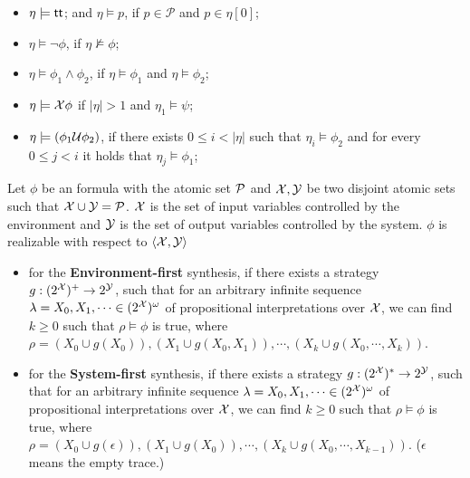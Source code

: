 \begin{itemize}%
  \item $\eta\models\true$; and $\eta\models p$, if $p\in\mathcal{P}$ and $p\in\eta[0]$;
  \item $\eta\models\neg\phi$, if $\eta\not\models\phi$;
  \item $\eta\models\phi_1\wedge\phi_2$,  if $\eta\models\phi_1$ and $\eta\models\phi_2$;
  \item $\eta\models \X\phi$ if $|\eta|>1$ and $\eta_1\models\psi$;
  \item $\eta\models (\phi_1 \U\phi_2)$, if there exists $0\leq i < |\eta|$
  such that $\eta_i\models\phi_2$ and for every $0\leq j < i$ it holds that $\eta_j\models\phi_1$;
  \end{itemize}


\begin{definition}\label{def:synthesis}
Let $\phi$ be an \ltlf formula with the atomic set $\P$ and $\X,\Y$ be two disjoint atomic sets such that $\X\cup \Y= \P$. $\X$ is the set of input variables controlled by the environment and $\Y$ is the set of output variables controlled by the system. $\phi$ is realizable with respect to $\langle \X,\Y\rangle$
\begin{itemize}
\item for the \textbf{Environment-first} synthesis, if there exists a strategy $g: (2^\X)^+ \to 2^\Y$, such that for an arbitrary infinite sequence $\lambda = X_0, X_1, \cdots \in (2^\X)^\omega$ of propositional interpretations over $\X$, we can find $k \geq 0$ such that $\rho\models\phi$ is true, where $\rho=(X_0\cup g(X_0)),(X_1\cup g(X_0,X_1)),\cdots,(X_k\cup g(X_0,\cdots,X_k))$.
\item for the \textbf{System-first} synthesis, if there exists a strategy $g: (2^\X)^* \to 2^\Y$, such that for an arbitrary infinite sequence $\lambda = X_0, X_1, \cdots \in (2^\X)^\omega$ of propositional interpretations over $\X$, we can find $k \geq 0$ such that $\rho\models\phi$ is true, where $\rho=(X_0\cup g(\epsilon)),(X_1\cup g(X_0)),\cdots,(X_k\cup g(X_0,\cdots,X_{k-1}))$. ($\epsilon$ means the empty trace.) 
\end{itemize}
\end{definition}

